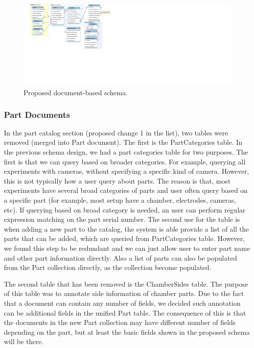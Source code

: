 \begin{figure}[h]
\begin{center}
\includegraphics[width=6in]{figures/doc-schema.pdf}
\caption{Proposed document-based schema.\label{proposed-schema}}
\end{center}
\end{figure}

\subsubsection{Part Documents }

In the part catalog section (proposed change 1 in the list), two tables were removed (merged into Part document). The first is the PartCategories table. In the previous schema design, we had a part categories table for two purposes. The first is that we can query based on broader categories. For example, querying all experiments with cameras, without specifying a specific kind of camera. However, this is not typically how a user query about parts. The reason is that, most experiments have several broad categories of parts and user often query based on a specific part (for example, most setup have a chamber, electrodes, cameras, etc). If querying based on broad category is needed, an user can perform regular expression matching on the part serial number. The second use for the table is when adding a new part to the catalog, the system is able provide a list of all the parts that can be added, which are queried from PartCategories table. However, we found this step to be redundant and we can just allow user to enter part name and other part information directly. Also a list of parts can also be populated from the Part collection directly, as the collection become populated.

The second table that has been removed is the ChamberSides table. The purpose of this table was to annotate side information of chamber parts. Due to the fact that a document can contain any number of fields, we decided such annotation can be additional fields in the unified Part table. The consequence of this is that the documents in the new Part collection may have different number of fields depending on the part, but at least the basic fields shown in the proposed schema will be there.

